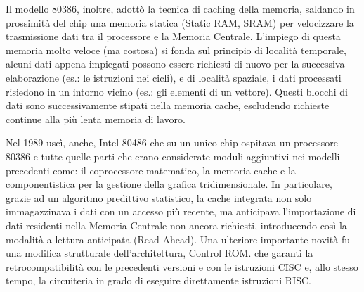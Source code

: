 \documentclass[12pt]{article} %
\begin{document}
Il modello 80386, inoltre, adottò la tecnica di caching della memoria, saldando in prossimità del chip una memoria statica (Static RAM, SRAM) per velocizzare la trasmissione dati tra il processore e la Memoria Centrale. L’impiego di questa memoria molto veloce (ma costosa) si fonda sul principio di località temporale, alcuni dati appena impiegati possono essere richiesti di nuovo per la successiva elaborazione (es.: le istruzioni nei cicli), e di località spaziale, i dati processati risiedono in un intorno vicino (es.: gli elementi di un vettore). Questi blocchi di dati sono successivamente stipati nella memoria cache, escludendo richieste continue alla più lenta memoria di lavoro.\par\medskip\noindent
Nel 1989 uscì, anche, Intel 80486 che su un unico chip ospitava un processore 80386 e tutte quelle parti che erano considerate moduli aggiuntivi nei modelli precedenti come: il coprocessore matematico, la memoria cache e la componentistica per la gestione della grafica tridimensionale. In particolare, grazie ad un algoritmo predittivo statistico, la cache integrata non solo immagazzinava i dati con un accesso più recente, ma anticipava l’importazione di dati residenti nella Memoria Centrale non ancora richiesti, introducendo così la modalità a lettura anticipata (Read-Ahead). Una ulteriore importante novità fu una modifica strutturale dell’architettura, Control ROM. che garantì la retrocompatibilità con le precedenti versioni e con le istruzioni CISC e, allo stesso tempo, la circuiteria in grado di eseguire direttamente istruzioni RISC.
\par\medskip\noindent
\end{document}
